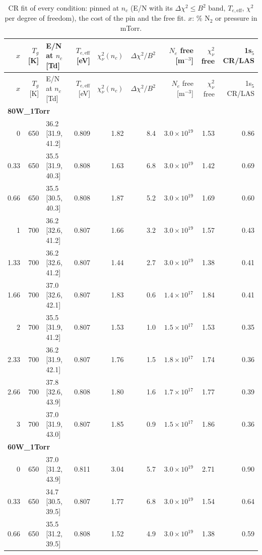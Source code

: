 \begin{longtable}{rrlrrrrrr}
\caption{CR fit of every condition: pinned at $n_c$ (E/N with its $\Delta\chi^2\le B^2$ band, $T_{e,\mathrm{eff}}$, $\chi^2$ per degree of freedom), the cost of the pin and the free fit. $x$: \% N$_2$ or pressure in mTorr.}\label{tab:fits}\\
\toprule $x$ & $T_g$ [K] & E/N at $n_c$ [Td] & $T_{e,\mathrm{eff}}$ [eV] & $\chi^2_\nu(n_c)$ & $\Delta\chi^2/B^2$ & $N_e$ free [m$^{-3}$] & $\chi^2_\nu$ free & 1s$_5$ CR/LAS \\ \endfirsthead
\toprule $x$ & $T_g$ [K] & E/N at $n_c$ [Td] & $T_{e,\mathrm{eff}}$ [eV] & $\chi^2_\nu(n_c)$ & $\Delta\chi^2/B^2$ & $N_e$ free [m$^{-3}$] & $\chi^2_\nu$ free & 1s$_5$ CR/LAS \\ \endhead
\midrule\multicolumn{9}{l}{\textbf{80W\_1Torr}}\\
0 & 650 & 36.2 [31.9, 41.2] & 0.809 & 1.82 & 8.4 & $3.0\times10^{19}$ & 1.53 & 0.86 \\
0.33 & 650 & 35.5 [31.9, 40.3] & 0.808 & 1.63 & 6.8 & $3.0\times10^{19}$ & 1.42 & 0.69 \\
0.66 & 650 & 35.5 [30.5, 40.3] & 0.808 & 1.87 & 5.2 & $3.0\times10^{19}$ & 1.69 & 0.60 \\
1 & 700 & 36.2 [32.6, 41.2] & 0.807 & 1.66 & 3.2 & $3.0\times10^{19}$ & 1.57 & 0.43 \\
1.33 & 700 & 36.2 [32.6, 41.2] & 0.807 & 1.44 & 2.7 & $3.0\times10^{19}$ & 1.38 & 0.41 \\
1.66 & 700 & 37.0 [32.6, 42.1] & 0.807 & 1.83 & 0.6 & $1.4\times10^{17}$ & 1.84 & 0.41 \\
2 & 700 & 35.5 [31.9, 41.2] & 0.807 & 1.53 & 1.0 & $1.5\times10^{17}$ & 1.53 & 0.35 \\
2.33 & 700 & 36.2 [31.9, 42.1] & 0.807 & 1.76 & 1.5 & $1.8\times10^{17}$ & 1.74 & 0.36 \\
2.66 & 700 & 37.8 [32.6, 43.9] & 0.808 & 1.80 & 1.6 & $1.7\times10^{17}$ & 1.77 & 0.39 \\
3 & 700 & 37.0 [31.9, 43.0] & 0.807 & 1.85 & 0.9 & $1.5\times10^{17}$ & 1.86 & 0.36 \\
\midrule\multicolumn{9}{l}{\textbf{60W\_1Torr}}\\
0 & 650 & 37.0 [31.2, 43.9] & 0.811 & 3.04 & 5.7 & $3.0\times10^{19}$ & 2.71 & 0.90 \\
0.33 & 650 & 34.7 [30.5, 39.5] & 0.807 & 1.77 & 6.8 & $3.0\times10^{19}$ & 1.54 & 0.64 \\
0.66 & 650 & 35.5 [31.2, 39.5] & 0.808 & 1.52 & 4.9 & $3.0\times10^{19}$ & 1.38 & 0.59 \\

\end{longtable}
